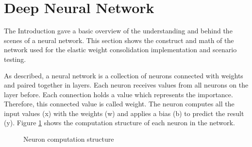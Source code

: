 \section{Deep Neural Network}
\label{foundations_deep_neural_network}

The Introduction gave a basic overview of the understanding and behind the scenes of a neural network.
This section shows the construct and math of the network used for the elastic weight consolidation implementation and scenario testing.

As described, a neural network is a collection of neurons connected with weights and paired together in layers.
Each neuron receives values from all neurons on the layer before.
Each connection holds a value which represents the importance.
Therefore, this connected value is called weight.
The neuron computes all the input values (x) with the weights (w) and applies a bias (b) to predict the result (y).
Figure \ref{fig:dnn_node_procedure} shows the computation structure of each neuron in the network.
\cite{math_nn_skalski}

\begin{figure}[H]
    \centering
    \caption{\cite{dnn_neuron_basic_overview} Neuron computation structure}
    \label{fig:dnn_node_procedure}
\end{figure}

